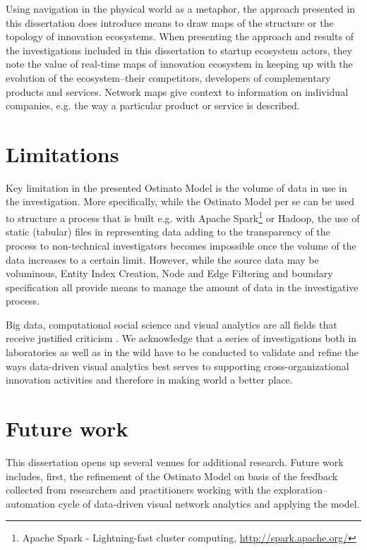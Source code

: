 Using navigation in the physical world as a metaphor, the approach presented in this dissertation does introduce means to draw maps of the structure or the topology of innovation ecosystems. When presenting the approach and results of the investigations included in this dissertation to startup ecosystem actors, they note the value of real-time maps of innovation ecosystem in keeping up with the evolution of the ecosystem--their competitors, developers of complementary products and services. Network maps give context to information on individual companies, e.g. the way a particular product or service is described.

\section{Limitations}

Key limitation in the presented Ostinato Model is the volume of data in use in the investigation. More specifically, while the Ostinato Model per se can be used to structure a process that is built e.g. with Apache Spark\footnote{Apache Spark - Lightning-fast cluster computing, \url{http://spark.apache.org/}} or Hadoop, the use of static (tabular) files in representing data adding to the transparency of the process to non-technical investigators becomes impossible once the volume of the data increases to a certain limit. However, while the source data may be voluminous, Entity Index Creation, Node and Edge Filtering and boundary specification all provide means to manage the amount of data in the investigative process.

Big data, computational social science and visual analytics are all fields that receive justified criticism \citep[cf.][]{boyd2012CriticalData}. We acknowledge that a series of investigations both in laboratories as well as in the wild have to be conducted to validate and refine the ways data-driven visual analytics best serves to supporting cross-organizational innovation activities and therefore in making world a better place.

\section{Future work}

This dissertation opens up several venues for additional research. Future work includes, first, the refinement of the Ostinato Model on basis of the feedback collected from researchers and practitioners working with the exploration–automation cycle of data-driven visual network analytics and applying the model.

